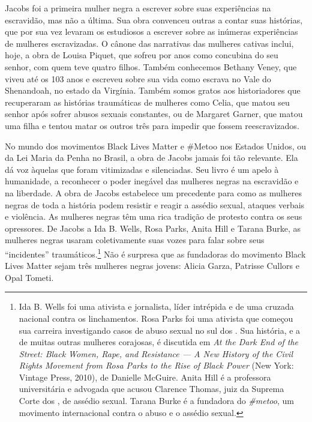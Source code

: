 Jacobs foi a primeira mulher negra a escrever sobre suas
experiências na escravidão, mas não a última. Sua obra convenceu outras a contar suas
histórias, que por sua vez levaram os estudiosos a escrever sobre as
inúmeras experiências de mulheres escravizadas. O cânone das narrativas
das mulheres cativas inclui, hoje, a obra de Louisa Piquet, que
sofreu por anos como concubina do seu senhor, com quem teve quatro
filhos. Também conhecemos Bethany Veney, que viveu até os 103 anos e
escreveu sobre sua vida como escrava no Vale do Shenandoah, no estado da
Virgínia. Também somos gratos aos historiadores que recuperaram as
histórias traumáticas de mulheres como Celia, que matou seu senhor após
sofrer abusos sexuais constantes, ou de Margaret Garner, que matou uma
filha e tentou matar os outros três para impedir que fossem
reescravizados.

No mundo dos movimentos Black Lives Matter e \#Metoo nos Estados Unidos,
ou da Lei Maria da Penha no Brasil, a obra de Jacobs jamais foi tão
relevante. Ela dá voz àquelas que foram vitimizadas e silenciadas. Seu
livro é um apelo à humanidade, a reconhecer o poder inegável das
mulheres negras na escravidão e na liberdade. A obra de Jacobs
estabelece um precedente para como as mulheres negras de toda a história
podem resistir e reagir a assédio sexual, ataques verbais e violência.
As mulheres negras têm uma rica tradição de protesto contra os seus
opressores. De Jacobs a Ida B. Wells, Rosa Parks, Anita Hill e Tarana
Burke, as mulheres negras usaram coletivamente suas vozes para falar
sobre seus ``incidentes'' traumáticos.\footnote{Ida B. Wells foi uma
  ativista e jornalista, líder intrépida e de uma cruzada nacional
  contra os linchamentos. Rosa Parks foi uma ativista que começou sua
  carreira investigando casos de abuso sexual no sul dos . Sua
  história, e a de muitas outras mulheres corajosas, é discutida em
  \emph{At the Dark End of the Street: Black Women, Rape, and
  Resistance --- A New History of the Civil Rights Movement from Rosa
  Parks to the Rise of Black Power} (New York: Vintage Press, 2010), de
  Danielle McGuire. Anita Hill é a professora universitária e advogada
  que acusou Clarence Thomas, juiz da Suprema Corte dos , de assédio
  sexual. Tarana Burke é a fundadora do \emph{\#metoo}, um movimento
  internacional contra o abuso e o assédio sexual.} Não é surpresa que
as fundadoras do movimento Black Lives Matter sejam três mulheres negras
jovens: Alicia Garza, Patrisse Cullors e Opal Tometi.

